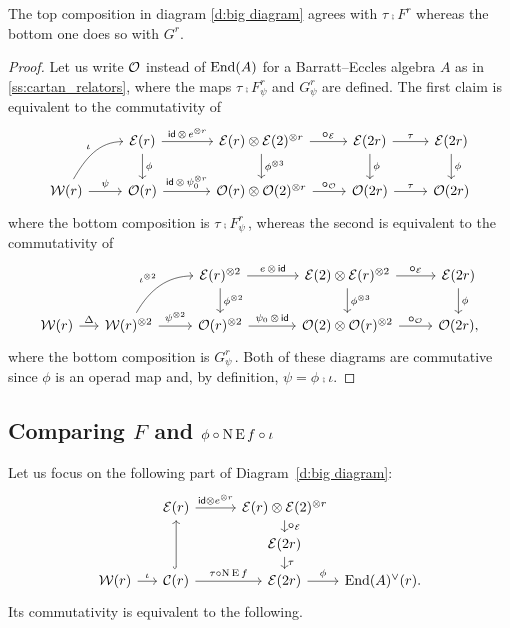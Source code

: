 \begin{lemma}\label{l:main_diag}
	The top composition in diagram \eqref{d:big diagram} agrees with $\tau \comp F^r$ whereas the bottom one does so with $G^r$.
\end{lemma}

\begin{proof}
	Let us write $\mathcal{O}$ instead of $\mathrm{End}(A)$ for a Barratt--Eccles algebra $A$ as in \cref{ss:cartan_relators}, where the maps $\tau \comp F_\psi^r$ and $G_\psi^r$ are defined.
	The first claim is equivalent to the commutativity of
	\[
	\begin{tikzcd}
		&
		\BE(r) \arrow[d,"\phi"] \arrow[r,"\id\, \ot\, e^{\ot r}"] &[10pt]
		\BE(r) \ot \BE(2)^{\ot r} \arrow[d,"\phi^{\ot 3}"] \arrow[r,"\bcomp_{\BE}"] &
		\BE(2r) \arrow[d,"\phi"] \arrow[r,"\tau"] &
		\BE(2r) \arrow[d,"\phi"] \\
		\cW(r) \arrow[r,"\psi"] \arrow[ur, in=180, out=60,"\iota"] &
		\cO(r) \arrow[r,"\id\, \ot\, \psi_0^{\ot r}"] &
		\cO(r) \ot \cO(2)^{\ot r} \arrow[r,"\bcomp_{\cO}"] &
		\cO(2r) \arrow[r,"\tau"] &
		\cO(2r)
	\end{tikzcd}
	\]
	where the bottom composition is $\tau \comp F_\psi^r$\,, whereas the second is equivalent to the commutativity of
	\[
	\begin{tikzcd}
		&[-10pt] &
		\BE(r)^{\ot2} \arrow[d,"\phi^{\ot 2}"] \arrow[r,"e\,\ot\,\id"] &[10pt]
		\BE(2) \ot \BE(r)^{\ot2} \arrow[d,"\phi^{\ot 3}"] \arrow[r,"\bcomp_{\BE}"] &
		\BE(2r) \arrow[d,"\phi"] \\
		\cW(r) \arrow[r,"\Delta"] &
		\cW(r)^{\ot 2} \arrow[r,"\psi^{\ot 2}"] \arrow[ur, in=180, out=60,"\iota^{\ot 2}"] &
		\cO(r)^{\ot 2} \arrow[r,"\psi_0\,\ot\,\id"] &
		\cO(2) \ot \cO(r)^{\ot 2} \arrow[r,"\bcomp_{\cO}"] &
		\cO(2r),
	\end{tikzcd}
	\]
	where the bottom composition is $G_\psi^r$\,.
	Both of these diagrams are commutative since $\phi$ is an operad map and, by definition, $\psi = \phi \comp \iota$.
\end{proof}

\subsection{Comparing $F$ and $\phi \mathbin{\circ} \operatorname{N}\operatorname{E} f \mathbin{\circ} \iota$}

Let us focus on the following part of Diagram~\eqref{d:big diagram}:
\[
\begin{tikzcd}[row sep=small]
	&[-10pt]\BE(r) \arrow[r,"\id \ot e^{\ot r}"] &[5pt]
	\BE(r) \ot \BE(2)^{\ot r} \arrow[d,"\bcomp_{\BE}"] &[-20pt] \\ &
	&\BE(2r) \arrow[d, "\tau"] & \\
	\cW(r) \arrow[r,"\iota"] &
	\cC(r) \arrow[uu,hook] \arrow[r,"\tau \comp \chains\EE f"] &
	\BE(2r) \arrow[r,"\phi"] & \End(A)^\vee(r).
\end{tikzcd}
\]
Its commutativity is equivalent to the following.

